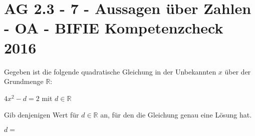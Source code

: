 \section{AG 2.3 - 7 - Aussagen über Zahlen - OA - BIFIE Kompetenzcheck 2016}

\begin{beispiel}[AG 2.3]{1} %
				Gegeben ist die folgende quadratische Gleichung in der Unbekannten $x$ über der Grundmenge $\mathbb{R}$:
\begin{center}
$4x^2-d=2$ mit $d\in\mathbb{R}$
\end{center}

Gib denjenigen Wert für $d\in\mathbb{R}$ an, für den die Gleichung genau eine Lösung hat.


$d=$ 

\end{beispiel}	